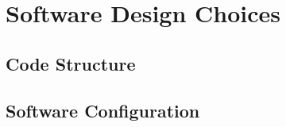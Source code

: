 \section{Software Design Choices}

\subsection{Code Structure}

\subsection{Software Configuration}
